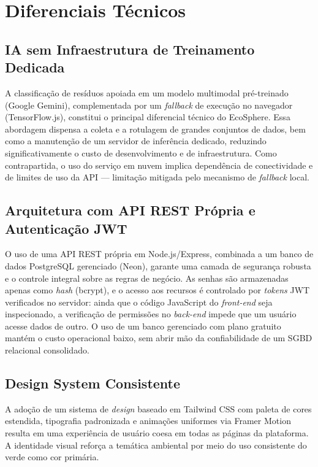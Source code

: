 \documentclass[
	12pt,
	openright,
	oneside,
	a4paper,
	chapter=TITLE,
	section=TITLE,
	subsection=TITLE,
	subsubsection=TITLE,
	english,
	brazil
	]{abntex2}
\begin{document}
\section{Diferenciais Técnicos}

\subsection{IA sem Infraestrutura de Treinamento Dedicada}

A classificação de resíduos apoiada em um modelo multimodal pré-treinado (Google Gemini), complementada por um \textit{fallback} de execução no navegador (TensorFlow.js), constitui o principal diferencial técnico do EcoSphere. Essa abordagem dispensa a coleta e a rotulagem de grandes conjuntos de dados, bem como a manutenção de um servidor de inferência dedicado, reduzindo significativamente o custo de desenvolvimento e de infraestrutura. Como contrapartida, o uso do serviço em nuvem implica dependência de conectividade e de limites de uso da API — limitação mitigada pelo mecanismo de \textit{fallback} local.

\subsection{Arquitetura com API REST Própria e Autenticação JWT}

O uso de uma API REST própria em Node.js/Express, combinada a um banco de dados PostgreSQL gerenciado (Neon), garante uma camada de segurança robusta e o controle integral sobre as regras de negócio. As senhas são armazenadas apenas como \textit{hash} (bcrypt), e o acesso aos recursos é controlado por \textit{tokens} JWT verificados no servidor: ainda que o código JavaScript do \textit{front-end} seja inspecionado, a verificação de permissões no \textit{back-end} impede que um usuário acesse dados de outro. O uso de um banco gerenciado com plano gratuito mantém o custo operacional baixo, sem abrir mão da confiabilidade de um SGBD relacional consolidado.

\subsection{Design System Consistente}

A adoção de um sistema de \textit{design} baseado em Tailwind CSS com paleta de cores estendida, tipografia padronizada e animações uniformes via Framer Motion resulta em uma experiência de usuário coesa em todas as páginas da plataforma. A identidade visual reforça a temática ambiental por meio do uso consistente do verde como cor primária.
\end{document}
